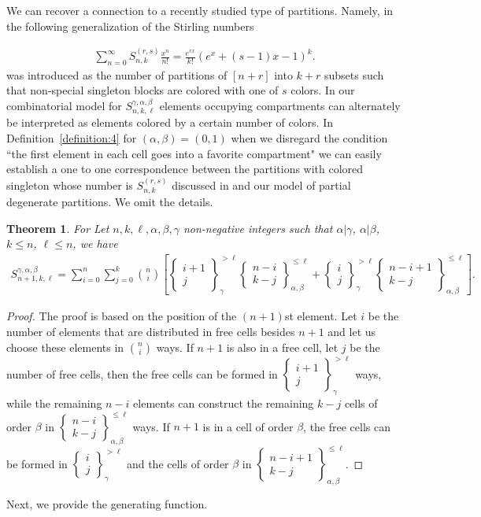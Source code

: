 \documentclass[12pt, reqno]{amsart}
\newtheorem{proof 1}{proof 1}
\newtheorem{theorem}{Theorem}[section]
\def\sts#1#2{\begin{Bmatrix}
#1 \\ #2 \end{Bmatrix}}
\begin{document}
We can recover a connection to a recently studied type of partitions. Namely, in \cite{mansour2024set} the following generalization of the Stirling numbers 

\begin{align*}
	\sum_{n=0}^\infty S^{(r,s)}_{n,k}\frac{x^n}{n!}=\frac{e^{rx}}{k!}\left(
		e^x+(s-1)x-1
	\right)^k.
\end{align*}
was introduced as the number of partitions of $[n+r]$ into $k+r$ subsets such that non-special singleton blocks are colored with one of $s$ colors. 
In our combinatorial model for $S^{\gamma,\alpha,\beta}_{n,k,\ell}$ elements occupying compartments can alternately be interpreted as elements colored by a certain number of colors. In Definition~\ref{definition:4} for $(\alpha,\beta)=(0,1)$ when we disregard the condition ``the first element in each cell goes into a favorite compartment" we can easily establish a one to one correspondence between the partitions with colored singleton whose number is $S^{(r,s)}_{n,k}$ discussed in \cite{mansour2024set} and our model of partial degenerate partitions. We omit the details.  

\begin{theorem}For Let $n,k,\ell, \alpha,\beta,\gamma$ non-negative integers such that $\alpha|\gamma$, $\alpha|\beta$, $k\leq n$, $\ell\leq n$, we have
	\begin{align*}
		S^{\gamma,\alpha,\beta}_{n+1,k,\ell}= \sum_{i=0}^n\sum_{j=0}^k\binom{n}{i}\left[\sts{i+1}{j}_\gamma^{> \ell}\sts{n-i}{k-j}_{\alpha,\beta}^{\leq \ell}+ \sts{i}{j}_{\gamma}^{>\ell}\sts{n-i+1}{k-j}_{\alpha,\beta}^{\leq \ell}\right].
	\end{align*}
\end{theorem}
\begin{proof}The proof is based on the position of the $(n+1)$st element. Let $i$ be the number of elements that are distributed in free cells besides $n+1$ and let us choose these elements in $\binom{n}{i}$ ways.  If $n+1$ is also in a free cell, let $j$ be the number of free cells, then the free cells can be formed in $\sts{i+1}{j}_{\gamma}^{> \ell}$ ways, while the remaining $n-i$ elements can construct the remaining $k-j$ cells of order $\beta$ in $\sts{n-i}{k-j}_{\alpha,\beta}^{\leq \ell}$ ways. If $n+1$ is in a cell of order $\beta$, the free cells can be formed in $\sts{i}{j}_{\gamma}^{>\ell}$ and the cells of order $\beta$ in $\sts{n-i+1}{k-j}_{\alpha,\beta}^{\leq \ell}$. 
\end{proof}


Next, we provide the generating function.
\end{document}
